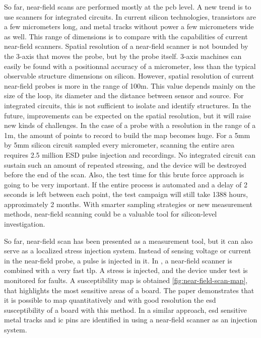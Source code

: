 So far, near-field scans are performed mostly at the \gls{pcb} level.
A new trend is to use scanners for integrated circuits.
In current silicon technologies, transistors are a few micrometers long, and metal tracks without power a few micrometers wide as well.
This range of dimensions is to compare with the capabilities of current near-field scanners.
Spatial resolution of a near-field scanner is not bounded by the 3-axis that moves the probe, but by the probe itself.
3-axis machines can easily be found with a positionnal accuracy of a micrometer, less than the typical observable structure dimensions on silicon.
However, spatial resolution of current near-field probes is more in the range of 100\textmu{}m.
This value depends mainly on the size of the loop, its diameter and the distance between sensor and source.
For integrated circuits, this is not sufficient to isolate and identify structures.
In the future, improvements can be expected on the spatial resolution, but it will raise new kinds of challenges.
In the case of a probe with a resolution in the range of a 1\textmu{}m, the amount of points to record to build the map becomes huge.
For a 5mm by 5mm silicon circuit sampled every micrometer, scanning the entire area requires 2.5 million ESD pulse injection and recordings.
No integrated circuit can sustain such an amount of repeated stressing, and the device will be destroyed before the end of the scan.
Also, the test time for this brute force approach is going to be very important.
If the entire process is automated and a delay of 2 seconds is left between each point, the test campaign will still take 1388 hours, approximately 2 months.
With smarter sampling strategies or new measurement methods, near-field scanning could be a valuable tool for silicon-level investigation.

So far, near-field scan has been presented as a measurement tool, but it can also serve as a localized stress injection system.
Instead of sensing voltage or current in the near-field probe, a pulse is injected in it.
In \cite{NearFieldInjectionFabrice}, a near-field scanner is combined with a very fast \gls{tlp}.
A stress is injected, and the device under test is monitored for faults.
A susceptibility map is obtained \ref{fig:near-field-scan-map}, that highlights the most sensitive areas of a board.
The paper demonstrates that it is possible to map quantitatively and with good resolution the \gls{esd} susceptibility of a board with this method.
In a similar approach, \gls{esd} sensitive metal tracks and \gls{ic} pins are identified in \cite{NearFieldInjectionBis} using a near-field scanner as an injection system.

